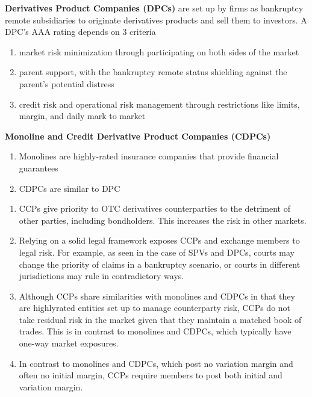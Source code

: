 \documentclass[11pt,fleqn]{report} %
\numberwithin{equation}{section} %
\numberwithin{figure}{section} %
\numberwithin{table}{section} %
\begin{document}
 \begin{definition}\textbf{Derivatives Product Companies (DPCs)} are set up by firms as bankruptcy remote subsidiaries to originate derivatives products and sell them to investors. A DPC's AAA rating depends on 3 criteria
 \begin{enumerate}
     \item market risk minimization through participating on both sides of the market
     \item parent support, with the bankruptcy remote status shielding against the parent’s potential distress
     \item credit risk and operational risk management through restrictions like limits, margin, and daily mark to market
 \end{enumerate}
 \end{definition}
 \begin{definition}\textbf{Monoline and Credit Derivative Product Companies (CDPCs)}  
 \begin{enumerate}
     \item Monolines are highly-rated insurance companies that provide financial guarantees
     \item CDPCs are similar to DPC
 \end{enumerate}
 \end{definition}
 \begin{remark}
 \begin{enumerate}
     \item CCPs give priority to OTC derivatives counterparties to the detriment of other parties, including bondholders. This increases the risk in other markets.
     \item Relying on a solid legal framework exposes CCPs and exchange members to legal risk. For example, as seen in the case of SPVs and DPCs, courts may change the priority of claims in a bankruptcy scenario, or courts in different jurisdictions may rule in contradictory ways.
     \item Although CCPs share similarities with monolines and CDPCs in that they are highlyrated entities set up to manage counterparty risk, CCPs do not take residual risk in the market given that they maintain a matched book of trades. This is in contrast to monolines and CDPCs, which typically have one-way market exposures.
     \item In contrast to monolines and CDPCs, which post no variation margin and often no initial margin, CCPs require members to post both initial and variation margin.
 \end{enumerate}
 \end{remark}
\end{document}
